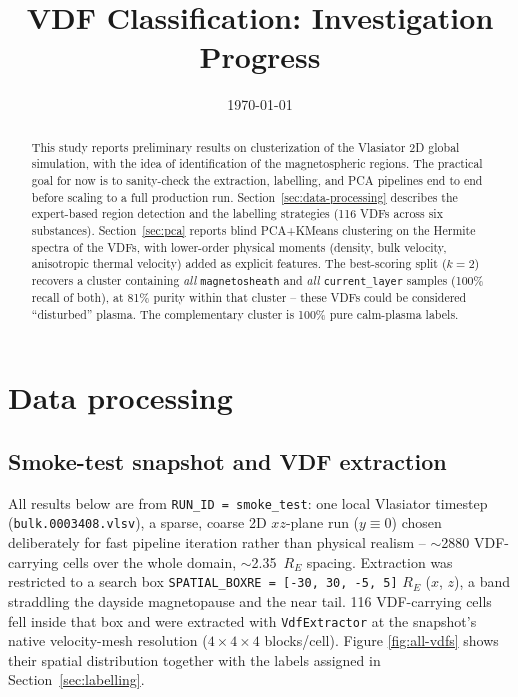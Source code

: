 \documentclass[11pt]{article}
\title{VDF Classification: Investigation Progress}
\author{}
\date{\today}
\begin{document}
\maketitle

\begin{abstract}
This study reports preliminary results on clusterization of the
Vlasiator 2D global simulation, with the idea of identification of the
magnetospheric regions. The practical goal for now is to sanity-check
the extraction, labelling, and PCA pipelines end to end before scaling
to a full production run. Section~\ref{sec:data-processing} describes
the expert-based region detection and the labelling strategies (116
VDFs across six substances). Section~\ref{sec:pca} reports blind
PCA+KMeans clustering on the Hermite spectra of the VDFs, with
lower-order physical moments (density, bulk velocity, anisotropic
thermal velocity) added as explicit features. The best-scoring split
($k=2$) recovers a cluster containing \emph{all} \texttt{magnetosheath}
and \emph{all} \texttt{current\_layer} samples (100\% recall of both),
at 81\% purity within that cluster -- these VDFs could be considered
``disturbed'' plasma. The complementary cluster is 100\% pure
calm-plasma labels.
\end{abstract}

\tableofcontents

\section{Data processing}
\label{sec:data-processing}

\subsection{Smoke-test snapshot and VDF extraction}
All results below are from \texttt{RUN\_ID = smoke\_test}: one local
Vlasiator timestep (\texttt{bulk.0003408.vlsv}), a sparse, coarse 2D
$xz$-plane run ($y \equiv 0$) chosen deliberately for fast pipeline
iteration rather than physical realism -- $\sim$2880 VDF-carrying cells
over the whole domain, $\sim$2.35~$R_E$ spacing. Extraction was
restricted to a search box \texttt{SPATIAL\_BOXRE~=~[-30, 30, -5, 5]}
$R_E$ ($x$, $z$), a band straddling the dayside magnetopause and the
near tail. 116 VDF-carrying cells fell inside that box and were
extracted with \texttt{VdfExtractor} at the snapshot's native
velocity-mesh resolution ($4\times4\times4$ blocks/cell). Figure
\ref{fig:all-vdfs} shows their spatial distribution together with the
labels assigned in Section~\ref{sec:labelling}.
\end{document}
